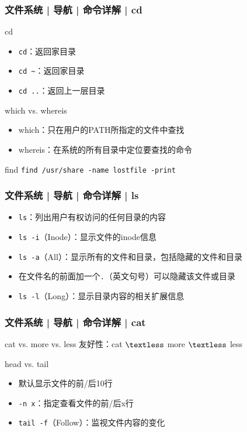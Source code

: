 \begin{frame}[fragile]
  \frametitle{文件系统 | 导航 | 命令详解 | cd}
  \begin{block}{\alert{cd}}
    \begin{itemize}
      \item \verb|cd|：返回家目录
      \item \verb|cd ~|：返回家目录
      \item \verb|cd ..|：返回上一层目录
    \end{itemize}
  \end{block}
  \pause
  \begin{block}{which vs. whereis}
    \begin{itemize}
      \item which：只在用户的PATH所指定的文件中查找
      \item whereis：在系统的所有目录中定位要查找的命令
    \end{itemize}
  \end{block}
  \pause
  \begin{block}{find}
    \verb|find /usr/share -name lostfile -print|
  \end{block}
\end{frame}

\begin{frame}[fragile]
  \frametitle{文件系统 | 导航 | 命令详解 | \alert{ls}}
  \begin{itemize}[<+->]
    \item \verb|ls|：列出用户有权访问的任何目录的内容
    \item \verb|ls -i|（Inode）：显示文件的inode信息
    \item \verb|ls -a|（All）：显示所有的文件和目录，包括隐藏的文件和目录
    \item 在文件名的前面加一个\verb|.|（英文句号）可以隐藏该文件或目录
    \item \verb|ls -l|（Long）：显示目录内容的相关扩展信息
  \end{itemize}
  \begin{figure}
    \centering
  \end{figure}
\end{frame}

\begin{frame}[fragile]
  \frametitle{文件系统 | 导航 | 命令详解 | cat}
  \begin{block}{cat vs. more vs. less}
    友好性：cat $\textless$ more $\textless$ less
  \end{block}
  \pause
  \begin{block}{\alert{head vs. tail}}
    \begin{itemize}
      \item 默认显示文件的前/后10行
      \item \verb|-n x|：指定查看文件的前/后x行
      \item \verb|tail -f|（Follow）：监视文件内容的变化
    \end{itemize}
  \end{block}
\end{frame}

